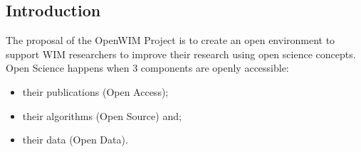 \documentclass[a0,portrait]{a0poster}
\begin{document}
\begin{multicols}{2} %


%
%


\color{black} %
\Large

\section*{Introduction}

The proposal of the OpenWIM Project is to create an open environment to support WIM researchers to improve their research using open science concepts.\\

Open Science happens when 3 components are openly accessible:\\

\begin{itemize}
\item their publications (Open Access);
\item their algorithms (Open Source) and;
\item their data (Open Data).
\end{itemize}


\end{multicols}
\end{document}
